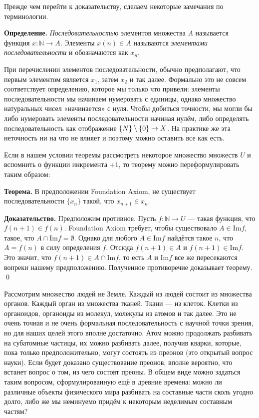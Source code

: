 Прежде чем перейти к доказательству, сделаем некоторые замечания по терминологии.

{\bfseries Определение.} {\slshape Последовательностью} элементов множества $A$ называется функция $x:\mathbb{N}\to A$. Элементы $x(n)\in A$ называются {\slshape элементами последовательности} и обозначаются как $x_n$.

При перечислении элементов последовательности, обычно предполагают, что первым элементом является $x_1$, затем $x_2$ и так далее. Формально это не совсем соответствует определению, которое мы только что привели: элементы последовательности мы начинаем нумеровать с единицы, однако множество натуральных чисел «начинается» с нуля. Чтобы добиться точности, мы могли бы либо нумеровать элементы последовательности начиная нулём, либо определять последовательность как отображение $\mathbb\{N\}\setminus \{0\} \to X$. На практике же эта неточность ни на что не влияет и поэтому можно оставить все как есть.

Если в нашем условии теоремы рассмотреть некоторое множество множеств $U$ и вспомнить о функции инкремента $+1$, то теорему можно переформулировать таким образом:

{\bfseries Теорема.} В предположении Foundation Axiom, не существует последовательности $\{x_n\}$ такой, что $x_{n+1} \in x_n$.

{\bfseries Доказательство.} Предположим противное. Пусть $f: \mathbb{N}\to U$ — такая функция, что $f(n+1) \in f(n)$. Foundation Axiom требует, чтобы существовало $A\in \mathrm{Im} f$, такое, что $A \cap \mathrm{Im}f = \emptyset$. Однако для любого $A\in \mathrm{Im} f$ найдётся такое $n$, что $A = f(n)$ в силу определения $f$. Отсюда $f(n+1) \in A$ и $f(n+1)\in \mathrm{Im}f$. Это значит, что $f(n+1)\in A \cap \mathrm{Im}f$, то есть $A$ и $\mathrm{Im}f$ все же пересекаются вопреки нашему предположению. Полученное противоречие доказывает теорему. \qed

Рассмотрим множество людей не Земле. Каждый из людей состоит из множества органов. Каждый орган из множества тканей. Ткани — из клеток. Клетки из органоидов, органоиды из молекул, молекулы из атомов и так далее. Это не очень точная и не очень формальная последовательность с научной точки зрения, но для наших целей этого вполне достаточно. Атом можно продолжать разбивать на субатомные частицы, их можно разбивать далее, получив кварки, которые, пока только предположительно, могут состоять из преонов (это открытый вопрос науки). Если будет доказано существование преонов, вполне вероятно, что встанет вопрос о том, из чего состоят преоны. В общем виде можно задаться таким вопросом, сформулированную ещё в древние времена: можно ли различные объекты физического мира разбивать на составные части сколь угодно долго, либо же мы неминуемо придём к некоторым неделимым составным частям?

